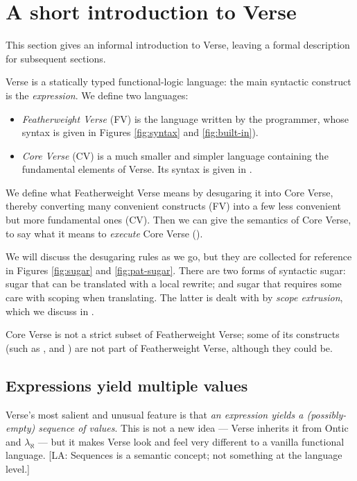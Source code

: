 \documentclass[acmsmall,review,anonymous,dvipsnames]{acmart}\settopmatter{printfolios=true,printccs=false,printacmref=false}
\newcommand{\lennart}[1]{{\color{dkcyan} [{LA}: #1]}}
\newcommand{\lennart}[1]{}
\newcommand{\vtt}[1]{\text{\tt #1}}
\newcommand{\clamx}[2]{lam (#1) in #2}
\newcommand{\clam}[2]{\vtt{\clamx{#1}{#2}}}
\begin{document}
\section{A short introduction to Verse} \label{sec:informal}

This section gives an informal introduction to Verse, leaving a formal description
for subsequent sections.

Verse is a statically typed functional-logic language: the main
syntactic construct is the \emph{expression}.  We define two languages:
\begin{itemize}
\item \emph{Featherweight Verse} (FV) is the language written by the programmer, whose syntax is given in
  Figures \ref{fig:syntax} and \ref{fig:built-in}).
\item \emph{Core Verse} (CV) is a much smaller and simpler language containing the fundamental elements of Verse. Its syntax is given in .
\end{itemize}
We define what Featherweight Verse means by desugaring it into Core Verse, thereby converting many convenient
constructs (FV) into a few less convenient but more fundamental ones (CV).  Then we can give the semantics
of Core Verse, to say what it means to \emph{execute} Core Verse ().

We will discuss the desugaring rules
as we go, but they are collected for reference in Figures \ref{fig:sugar} and \ref{fig:pat-sugar}.
There are two
forms of syntactic sugar: sugar that can be translated with a local rewrite;
and sugar that requires some care with scoping when translating.  The
latter is dealt with by \emph{scope extrusion}, which we discuss in
.

Core Verse is not a strict subset of Featherweight Verse; some of its constructs (such as \vtt{def}, \vtt{\clam{x}{e}} and \vtt{check})
are not part of Featherweight Verse, although they could be.

\subsection{Expressions yield multiple values} \label{sec:multi-value} \label{sec:false}

Verse's most salient and unusual feature is that \emph{an expression yields a (possibly-empty) sequence of values}.
This is not a new idea --- Verse inherits it from Ontic \cite{ontic} and $\lambda_\aleph$ \cite{lambda-aleph}
--- but it makes Verse look and feel very different to a vanilla functional language.
\lennart{Sequences is a semantic concept; not something at the language level.}
\end{document}
